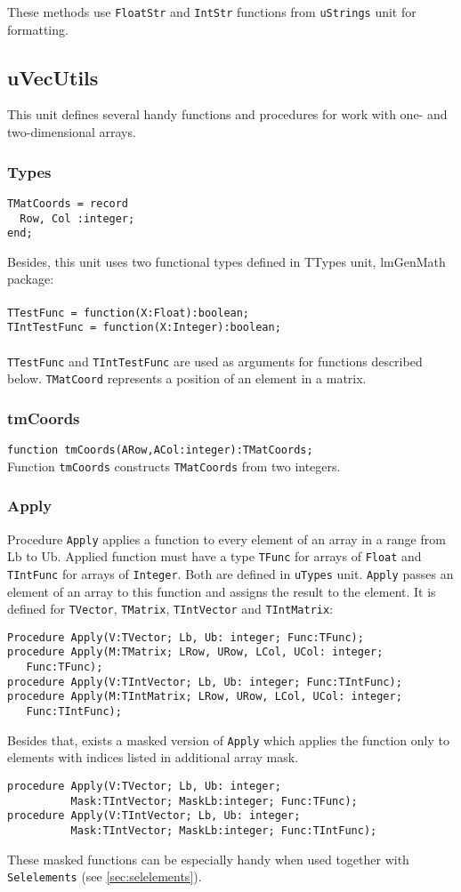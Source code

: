 \documentclass[12pt,a4paper,oneside]{article}
\newcommand{\code}[1]{\texttt{#1}}
\begin{document}
These methods use \code{FloatStr} and \code{IntStr} functions from \code{uStrings} unit for formatting. 

\subsection{uVecUtils}
This unit defines several handy functions and procedures for work with one- and two-dimensional arrays.
\subsubsection{Types}
\begin{verbatim}
TMatCoords = record
  Row, Col :integer;
end;
\end{verbatim}
Besides, this unit uses two functional types defined in TTypes unit, lmGenMath package:\\
\\
\code{TTestFunc    = function(X:Float):boolean;\\
TIntTestFunc = function(X:Integer):boolean;}\\
\\
\code{TTestFunc} and \code{TIntTestFunc} are used as arguments for functions described below. \code{TMatCoord} represents a position of an element in a matrix.
\subsubsection{tmCoords}
\code{function tmCoords(ARow,ACol:integer):TMatCoords;}\\
Function \code{tmCoords} constructs \code{TMatCoords} from two integers.
\subsubsection{Apply}
Procedure \code{Apply} applies a function to every element of an array in a range from Lb to Ub. Applied function must have a type \code{TFunc} for arrays of \code{Float} and \code{TIntFunc} for arrays of \code{Integer}. Both are defined in \code{uTypes} unit. \code{Apply} passes an element of an array to this function and assigns the result to the element. It is defined for \code{TVector}, \code{TMatrix}, \code{TIntVector} and \code{TIntMatrix}:
\begin{verbatim}
Procedure Apply(V:TVector; Lb, Ub: integer; Func:TFunc);
procedure Apply(M:TMatrix; LRow, URow, LCol, UCol: integer; 
   Func:TFunc);
procedure Apply(V:TIntVector; Lb, Ub: integer; Func:TIntFunc);
procedure Apply(M:TIntMatrix; LRow, URow, LCol, UCol: integer;
   Func:TIntFunc); 
\end{verbatim}
Besides that, exists a masked version of \code{Apply} which applies the function only to elements with indices listed in additional array mask.
\begin{verbatim}
procedure Apply(V:TVector; Lb, Ub: integer; 
          Mask:TIntVector; MaskLb:integer; Func:TFunc);
procedure Apply(V:TIntVector; Lb, Ub: integer;
          Mask:TIntVector; MaskLb:integer; Func:TIntFunc); 
\end{verbatim}
These masked functions can be especially handy when used together with \code{Selelements} (see \ref{sec:selelements}).
\end{document}
